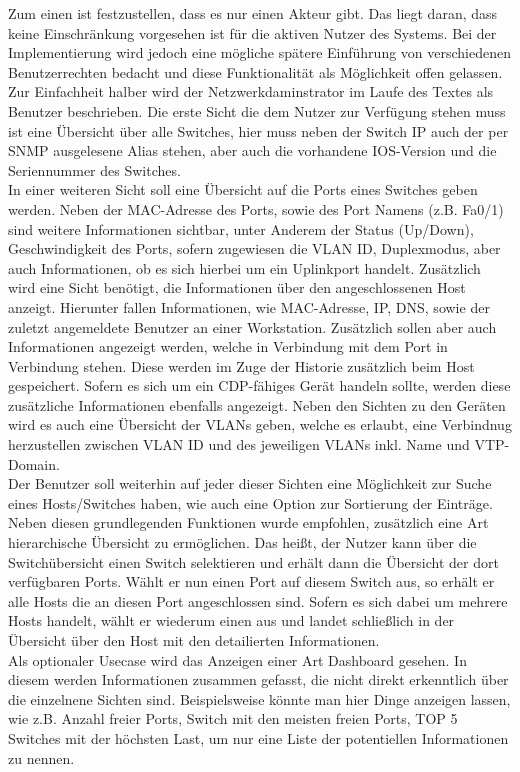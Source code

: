 Zum einen ist festzustellen, dass es nur einen Akteur gibt. Das liegt daran, dass keine Einschränkung vorgesehen ist für die aktiven Nutzer des Systems. Bei der Implementierung wird jedoch eine mögliche spätere Einführung von verschiedenen Benutzerrechten bedacht und diese Funktionalität als Möglichkeit offen gelassen. Zur Einfachheit halber wird der Netzwerkdaminstrator im Laufe des Textes als Benutzer beschrieben.
Die erste Sicht die dem Nutzer zur Verfügung stehen muss ist eine Übersicht über alle Switches, hier muss neben der Switch IP auch der per SNMP ausgelesene Alias stehen, aber auch die vorhandene IOS-Version und die Seriennummer des Switches.\\
In einer weiteren Sicht soll eine Übersicht auf die Ports eines Switches geben werden.
Neben der MAC-Adresse des Ports, sowie des Port Namens (z.B. Fa0/1) sind weitere Informationen sichtbar, unter Anderem der Status (Up/Down), Geschwindigkeit des Ports, sofern zugewiesen die VLAN ID, Duplexmodus, aber auch Informationen, ob es sich hierbei um ein Uplinkport handelt.
Zusätzlich wird eine Sicht benötigt, die Informationen über den angeschlossenen Host anzeigt.
Hierunter fallen Informationen, wie MAC-Adresse, IP, DNS, sowie der zuletzt angemeldete Benutzer an einer Workstation. Zusätzlich sollen aber auch Informationen angezeigt werden, welche in Verbindung mit dem Port in Verbindung stehen. Diese werden im Zuge der Historie zusätzlich beim Host gespeichert.
Sofern es sich um ein CDP-fähiges Gerät handeln sollte, werden diese zusätzliche Informationen ebenfalls angezeigt.
Neben den Sichten zu den Geräten wird es auch eine Übersicht der VLANs geben, welche es erlaubt, eine Verbindnug herzustellen zwischen VLAN ID und des jeweiligen VLANs inkl. Name und  VTP-Domain.\\
Der Benutzer soll weiterhin auf jeder dieser Sichten eine Möglichkeit zur Suche eines Hosts/Switches haben, wie auch eine Option zur Sortierung der Einträge.
Neben diesen grundlegenden Funktionen wurde empfohlen, zusätzlich eine Art hierarchische Übersicht zu ermöglichen. Das heißt, der Nutzer kann über die Switchübersicht einen Switch selektieren und erhält dann die Übersicht der dort verfügbaren Ports. Wählt er nun einen Port auf diesem Switch aus, so erhält er alle Hosts die an diesen Port angeschlossen sind.
Sofern es sich dabei um mehrere Hosts handelt, wählt er wiederum einen aus und landet schließlich in der Übersicht über den Host mit den detailierten Informationen.\\
Als optionaler Usecase wird das Anzeigen einer Art Dashboard gesehen.
In diesem werden Informationen zusammen gefasst, die nicht direkt erkenntlich über die einzelnene Sichten sind. Beispielsweise könnte man hier Dinge anzeigen lassen, wie z.B. Anzahl freier Ports, Switch mit den meisten freien Ports, TOP 5 Switches mit der höchsten Last, um nur eine Liste der potentiellen Informationen zu nennen.

